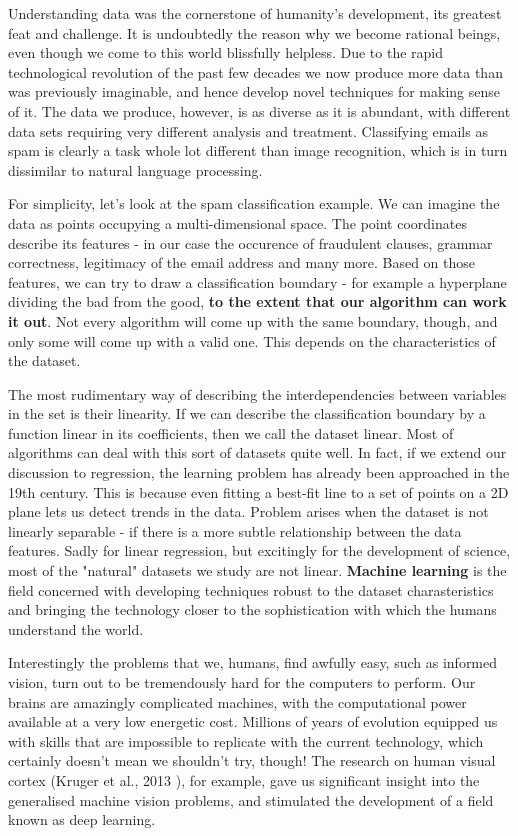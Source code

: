 \documentclass[a4paper, 12pt]{article}
\numberwithin{equation}{section}
\begin{document}
	Understanding data was the cornerstone of humanity's development, its greatest feat and challenge. It is undoubtedly the reason why we become rational beings, even though we come to this world blissfully helpless. Due to the rapid technological revolution of the past few decades we now produce more data than was previously imaginable, and hence develop novel techniques for making sense of it. The data we produce, however, is as diverse as it is abundant, with different data sets requiring very different analysis and treatment. Classifying emails as spam is clearly a task whole lot different than image recognition, which is in turn dissimilar to natural language processing.
	
	For simplicity, let's look at the spam classification example. We can imagine the data as points occupying a multi-dimensional space. The point coordinates describe its features - in our case the occurence of fraudulent clauses, grammar correctness, legitimacy of the email address and many more. Based on those features, we can try to draw a classification boundary - for example a hyperplane dividing the bad from the good, \textbf{to the extent that our algorithm can work it out}. Not every algorithm will come up with the same boundary, though, and only some will come up with a valid one. This depends on the characteristics of the dataset.
	
	The most rudimentary way of describing the interdependencies between variables in the set is their linearity. If we can describe the classification boundary by a function linear in its coefficients, then we call the dataset linear. Most of algorithms can deal with this sort of datasets quite well. In fact, if we extend our discussion to regression, the learning problem has already been approached in the 19th century. This is because even fitting a best-fit line to a set of points on a 2D plane lets us detect trends in the data. Problem arises when the dataset is not linearly separable - if there is a more subtle relationship between the data features. Sadly for linear regression, but excitingly for the development of science, most of the "natural" datasets we study are not linear. \textbf{Machine learning} is the field concerned with developing techniques robust to the dataset charasteristics and bringing the technology closer to the sophistication with which the humans understand the world.
	
	Interestingly the problems that we, humans, find awfully easy, such as informed vision, turn out to be tremendously hard for the computers to perform. Our brains are amazingly complicated machines, with the computational power available at a very low energetic cost. Millions of years of evolution equipped us with skills that are impossible to replicate with the current technology, which certainly doesn't mean we shouldn't try, though! The research on human visual cortex (Kruger et al., 2013 \cite{kruger2013deep}), for example, gave us significant insight into the generalised machine vision problems, and stimulated the development of a field known as deep learning.
	
\end{document}
